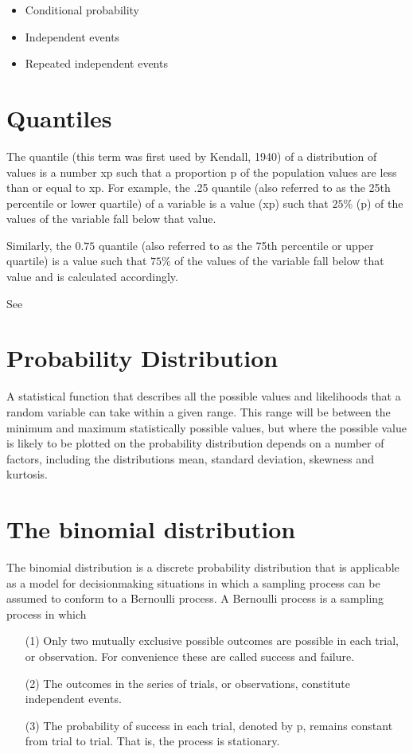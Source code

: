 \documentclass[12pt]{report}
\begin{document}
\begin{itemize}
	\item Conditional probability
	\item Independent events
	\item Repeated independent events
\end{itemize}



\section{Quantiles}

The quantile (this term was first used by Kendall, 1940) of a distribution of values is a number xp such that a proportion p of the population values are less than or equal to xp. For example, the .25 quantile (also referred to as the 25th percentile or lower quartile) of a variable is a value (xp) such that $25\%$ (p) of the values of the variable fall below that value.

Similarly, the $0.75$ quantile (also referred to as the 75th percentile or upper quartile) is a value such that $75\%$ of the values of the variable fall below that value and is calculated accordingly.

See



\section{Probability Distribution}

A statistical function that describes all the possible values and likelihoods that a random variable can take within a given range. This range will be between the minimum and maximum statistically possible values, but where the possible value is likely to be plotted on the probability distribution depends on a number of factors, including the distributions mean, standard deviation, skewness and kurtosis.



\section{The binomial distribution }

The binomial distribution  is a discrete probability distribution that is applicable as a model for decisionmaking
situations in which a sampling process can be assumed to conform to a Bernoulli process. A Bernoulli
process is a sampling process in which
\begin{itemize}
\item[(1)] Only two mutually exclusive possible outcomes are possible in each trial, or observation. For
convenience these are called success and failure.
\item[(2)] The outcomes in the series of trials, or observations, constitute independent events.
\item[(3)] The probability of success in each trial, denoted by p, remains constant from trial to trial. That is,
the process is stationary.
\end{itemize}
\end{document}
